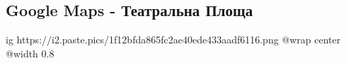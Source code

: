  
 
 
 
 

\subsection{Google Maps - Театральна Площа}

\ifcmt
  ig https://i2.paste.pics/1f12bfda865fc2ae40ede433aadf6116.png
  @wrap center
  @width 0.8
\fi



